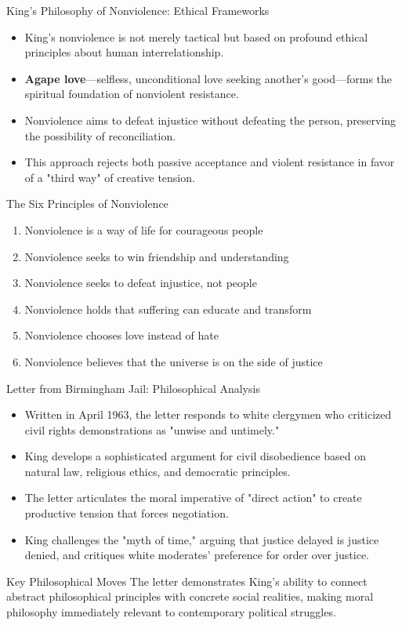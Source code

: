 \documentclass{beamer}
\begin{document}
	\begin{frame}{King's Philosophy of Nonviolence: Ethical Frameworks}
		\begin{itemize}
			\item King's nonviolence is not merely tactical but based on profound ethical principles about human interrelationship.
			\item \textbf{Agape love}—selfless, unconditional love seeking another's good—forms the spiritual foundation of nonviolent resistance.
			\item Nonviolence aims to defeat injustice without defeating the person, preserving the possibility of reconciliation.
			\item This approach rejects both passive acceptance and violent resistance in favor of a "third way" of creative tension.
		\end{itemize}
		
		\begin{alertblock}{The Six Principles of Nonviolence}
			\scriptsize
			\begin{enumerate}
				\item Nonviolence is a way of life for courageous people
				\item Nonviolence seeks to win friendship and understanding
				\item Nonviolence seeks to defeat injustice, not people
				\item Nonviolence holds that suffering can educate and transform
				\item Nonviolence chooses love instead of hate
				\item Nonviolence believes that the universe is on the side of justice
			\end{enumerate}
		\end{alertblock}
	\end{frame}
	
	\begin{frame}{Letter from Birmingham Jail: Philosophical Analysis}
		\begin{itemize}
			\item Written in April 1963, the letter responds to white clergymen who criticized civil rights demonstrations as "unwise and untimely."
			\item King develops a sophisticated argument for civil disobedience based on natural law, religious ethics, and democratic principles.
			\item The letter articulates the moral imperative of "direct action" to create productive tension that forces negotiation.
			\item King challenges the "myth of time," arguing that justice delayed is justice denied, and critiques white moderates' preference for order over justice.
		\end{itemize}
		
		\begin{block}{Key Philosophical Moves}
			The letter demonstrates King's ability to connect abstract philosophical principles with concrete social realities, making moral philosophy immediately relevant to contemporary political struggles.
		\end{block}
	\end{frame}
	
\end{document}
